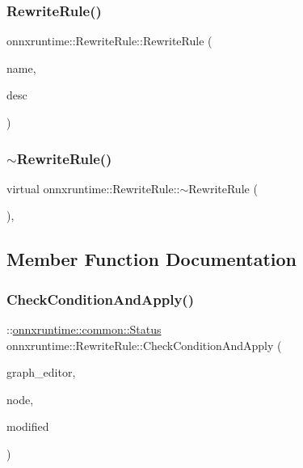 \subsubsection{\texorpdfstring{Rewrite\+Rule()}{RewriteRule()}}
{\footnotesize\ttfamily onnxruntime\+::\+Rewrite\+Rule\+::\+Rewrite\+Rule (\begin{DoxyParamCaption}\item[{const std\+::string \&}]{name,  }\item[{const std\+::string \&}]{desc }\end{DoxyParamCaption})\hspace{0.3cm}{\ttfamily [inline]}}

\mbox{\label{classonnxruntime_1_1RewriteRule_a965539324a76c8ae0e4c019fe6efbd1e}} 
\subsubsection{\texorpdfstring{$\sim$\+Rewrite\+Rule()}{~RewriteRule()}}
{\footnotesize\ttfamily virtual onnxruntime\+::\+Rewrite\+Rule\+::$\sim$\+Rewrite\+Rule (\begin{DoxyParamCaption}{ }\end{DoxyParamCaption})\hspace{0.3cm}{\ttfamily [virtual]}, {\ttfamily [default]}}



\subsection{Member Function Documentation}
\mbox{\label{classonnxruntime_1_1RewriteRule_acdd4eadfe4aca121e3912dc12bd82f17}} 
\subsubsection{\texorpdfstring{Check\+Condition\+And\+Apply()}{CheckConditionAndApply()}}
{\footnotesize\ttfamily \+::\mbox{\hyperlink{classonnxruntime_1_1common_1_1Status}{onnxruntime\+::common\+::\+Status}} onnxruntime\+::\+Rewrite\+Rule\+::\+Check\+Condition\+And\+Apply (\begin{DoxyParamCaption}\item[{\mbox{\hyperlink{classonnxruntime_1_1GraphEditor}{Graph\+Editor}} $\ast$}]{graph\+\_\+editor,  }\item[{\mbox{\hyperlink{classonnxruntime_1_1Node}{Node}} $\ast$}]{node,  }\item[{bool $\ast$}]{modified }\end{DoxyParamCaption})\hspace{0.3cm}{\ttfamily [inline]}}

